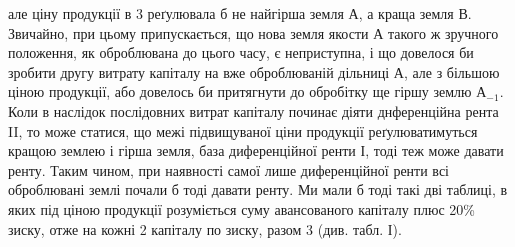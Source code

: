 \parcont{}  %
але ціну продукції в 3 реґулювала б не найгірша земля $А$, а краща
земля $В$. Звичайно, при цьому припускається, що нова земля якости $А$ такого
ж зручного положення, як оброблювана до цього часу, є неприступна, і що довелося
би зробити другу витрату капіталу на вже оброблюваній дільниці $А$, але
з більшою ціною продукції, або довелось би притягнути до обробітку ще гіршу
землю $А_{-1}$. Коли в наслідок послідовних витрат капіталу починає діяти днференційна
рента II, то може статися, що межі підвищуваної ціни продукції реґулюватимуться
кращою землею і гірша земля, база диференційної ренти І, тоді
теж може давати ренту. Таким чином, при наявності самої лише диференційної
ренти всі оброблювані землі почали б тоді давати ренту. Ми мали б тоді такі
дві таблиці, в яких під ціною продукції розуміється суму авансованого капіталу
плюс 20\%  зиску, отже на кожні 2 капіталу по 
зиску, разом 3 (див. табл. І).

